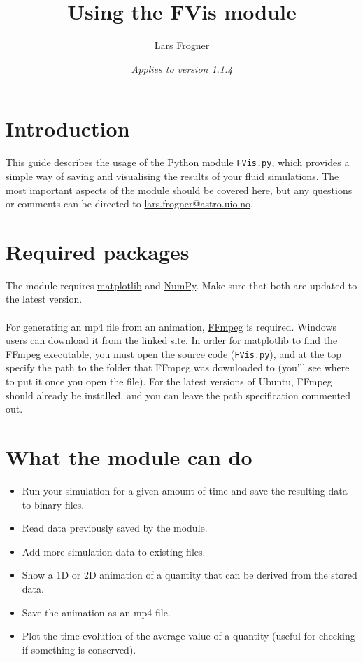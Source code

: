 \documentclass{article}
\newcommand{\ttt}[1]{\texttt{#1}}
\begin{document}
\title{\bfseries Using the FVis module}
\author{Lars Frogner}
\date{\textit{Applies to version 1.1.4}}

\maketitle
\tableofcontents
\newpage
{}

\section{Introduction}
\label{sec:intr}
This guide describes the usage of the Python module \ttt{FVis.py}, which provides a simple way of saving and visualising the results of your fluid simulations. The most important aspects of the module should be covered here, but any questions or comments can be directed to \href{mailto:lars.frogner@astro.uio.no}{lars.frogner@astro.uio.no}.

\section{Required packages}
\label{sec:pack}
The module requires \href{http://matplotlib.org/}{matplotlib} and \href{http://www.numpy.org/}{NumPy}. Make sure that both are updated to the latest version.\\\\
For generating an mp4 file from an animation, \href{https://ffmpeg.org/}{FFmpeg} is required. Windows users can download it from the linked site. In order for matplotlib to find the FFmpeg executable, you must open the source code (\ttt{FVis.py}), and at the top specify the path to the folder that FFmpeg was downloaded to (you'll see where to put it once you open the file). For the latest versions of Ubuntu, FFmpeg should already be installed, and you can leave the path specification commented out.

\section{What the module can do}
\label{sec:cando}
\begin{itemize}
	\item Run your simulation for a given amount of time and save the resulting data to binary files.
	\item Read data previously saved by the module.
	\item Add more simulation data to existing files.
	\item Show a 1D or 2D animation of a quantity that can be derived from the stored data.
	\item Save the animation as an mp4 file.
	\item Plot the time evolution of the average value of a quantity (useful for checking if something is conserved).
\end{itemize}
\end{document}
